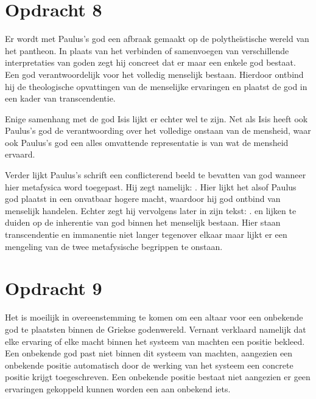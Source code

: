 \documentclass[10pt]{amsart}
\begin{document}
\section*{Opdracht 8}
Er wordt met Paulus's\autocite{paulusHandelingenApostelen1996} god een afbraak gemaakt op de polytheïstische wereld van het pantheon. In plaats van het verbinden of samenvoegen van verschillende interpretaties van goden zegt hij concreet dat er maar een enkele god bestaat. Een god verantwoordelijk voor het volledig menselijk bestaan. Hierdoor ontbind hij de theologische opvattingen van de menselijke ervaringen en plaatst de god in een kader van transcendentie.

Enige samenhang met de god Isis lijkt er echter wel te zijn. Net als Isis heeft ook Paulus's god de verantwoording over het volledige onstaan van de mensheid, waar ook Paulus's god een alles omvattende representatie is van wat de mensheid ervaard.

Verder lijkt Paulus's schrift een conflicterend beeld te bevatten van god wanneer hier metafysica word toegepast. Hij zegt namelijk: \autocite{paulusHandelingenApostelen1996}. Hier lijkt het alsof Paulus god plaatst in een onvatbaar hogere macht, waardoor hij god ontbind van menselijk handelen. Echter zegt hij vervolgens later in zijn tekst: \autocite{paulusHandelingenApostelen1996}.  en  lijken te duiden op de inherentie van god binnen het menselijk bestaan. Hier staan transcendentie en immanentie niet langer tegenover elkaar maar lijkt er een mengeling van de twee metafysische begrippen te onstaan.

\section*{Opdracht 9}
Het is moeilijk in overeenstemming te komen om een altaar voor een onbekende god te plaatsten binnen de Griekse godenwereld. Vernant verklaard namelijk dat elke ervaring of elke macht binnen het systeem van machten een positie bekleed.\autocite{vernantGreceAncienneEtude1976} Een onbekende god past niet binnen dit systeem van machten, aangezien een onbekende positie automatisch door de werking van het systeem een concrete positie krijgt toegeschreven. Een onbekende positie bestaat niet aangezien er geen ervaringen gekoppeld kunnen worden een aan onbekend iets.
\end{document}
